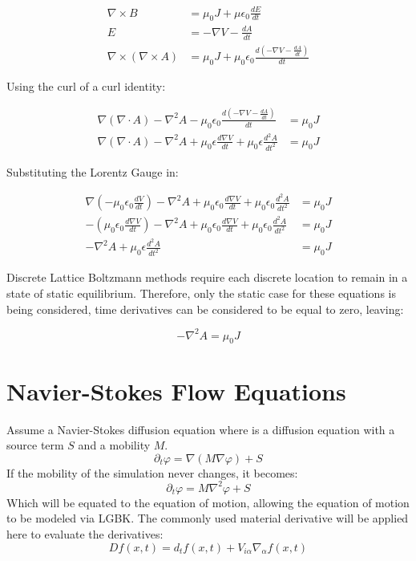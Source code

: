 \documentclass[12pt,a4paper]{article}
\begin{document}
\begin{align}
\nabla \times B &= \mu_0 J + \mu \epsilon_0 \frac{dE}{dt} \\
E &= -\nabla V - \frac{dA}{dt} \\
\nabla \times (\nabla \times A) &= \mu_0 J + \mu_0 \epsilon_0 \frac{d(-\nabla V - \frac{dA}{dt})}{dt}
\end{align}

Using the curl of a curl identity:

\begin{align}
\nabla (\nabla \cdot A) - \nabla^{2} A - \mu_0 \epsilon_0 \frac{d(-\nabla V - \frac{dA}{dt})}{dt} &= \mu_0 J \\
\nabla (\nabla \cdot A) - \nabla^{2} A + \mu_0 \epsilon \frac{d\nabla V}{dt} + \mu_0 \epsilon \frac{d^{2}A}{dt^{2}} &= \mu_0 J 
\end{align}

Substituting the Lorentz Gauge in:

\begin{align}
\nabla (- \mu_0 \epsilon_0 \frac{dV}{dt}) - \nabla^{2} A + \mu_0 \epsilon_0 \frac{d\nabla V}{dt} + \mu_0 \epsilon_0 \frac{d^{2}A}{dt^{2}} &= \mu_0 J \\
-(\mu_0 \epsilon_0 \frac{d \nabla V}{dt}) - \nabla^{2} A + \mu_0 \epsilon_0 \frac{d\nabla V}{dt} + \mu_0 \epsilon_0 \frac{d^{2}A}{dt^{2}} &= \mu_0 J \\
- \nabla^{2} A + \mu_0 \epsilon \frac{d^{2}A}{dt^{2}} &= \mu_0 J 
\end{align}

Discrete Lattice Boltzmann methods require each discrete location to remain in a state of static equilibrium. Therefore, only the static case for these equations is being considered, time derivatives can be considered to be equal to zero, leaving:

\begin{equation}
- \nabla^{2} A = \mu_0 J 
\end{equation}



\section{Navier-Stokes Flow Equations}
Assume a Navier-Stokes diffusion equation where is a diffusion equation with a source term $S$ and a mobility $M$.
\begin{equation}
\partial_t \varphi = \nabla (M\nabla \varphi)+S
\end{equation}
If the mobility of the simulation never changes, it becomes:
\begin{equation}
\partial_t \varphi = M\nabla^2 \varphi+S
\end{equation}
Which will be equated to the equation of motion, allowing the equation of motion to be modeled via LGBK. The commonly used material derivative will be applied here to evaluate the derivatives:
\begin{equation}
Df(x,t) = d_tf(x,t) + V_{i\alpha} \nabla_\alpha f(x,t)
\end{equation}
\end{document}

